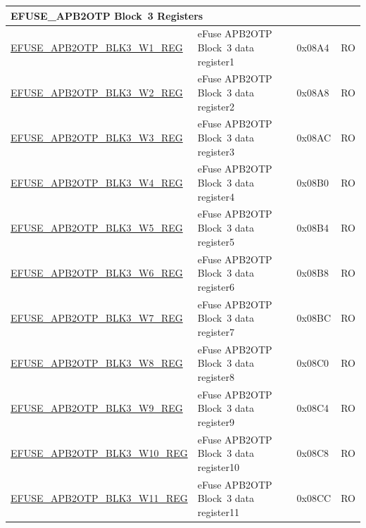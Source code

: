 \begin{longtable}{ | p{7cm} | p{6cm} | p{1.2cm} | p{1.5cm} | }
\multicolumn{4}{|l|}{\textbf{EFUSE\_APB2OTP Block~3 Registers}} \\ \hline
\hyperref[regdesc:EFUSEAPB2OTPBLK3WNREG]{EFUSE\_APB2OTP\_BLK3\_W1\_REG} & eFuse APB2OTP Block~3 data register1 & 0x08A4 & RO \\\hline
\hyperref[regdesc:EFUSEAPB2OTPBLK3WNREG]{EFUSE\_APB2OTP\_BLK3\_W2\_REG} & eFuse APB2OTP Block~3 data register2 & 0x08A8 & RO \\\hline
\hyperref[regdesc:EFUSEAPB2OTPBLK3WNREG]{EFUSE\_APB2OTP\_BLK3\_W3\_REG} & eFuse APB2OTP Block~3 data register3 & 0x08AC & RO \\\hline
\hyperref[regdesc:EFUSEAPB2OTPBLK3WNREG]{EFUSE\_APB2OTP\_BLK3\_W4\_REG} & eFuse APB2OTP Block~3 data register4 & 0x08B0 & RO \\\hline
\hyperref[regdesc:EFUSEAPB2OTPBLK3WNREG]{EFUSE\_APB2OTP\_BLK3\_W5\_REG} & eFuse APB2OTP Block~3 data register5 & 0x08B4 & RO \\\hline
\hyperref[regdesc:EFUSEAPB2OTPBLK3WNREG]{EFUSE\_APB2OTP\_BLK3\_W6\_REG} & eFuse APB2OTP Block~3 data register6 & 0x08B8 & RO \\\hline
\hyperref[regdesc:EFUSEAPB2OTPBLK3WNREG]{EFUSE\_APB2OTP\_BLK3\_W7\_REG} & eFuse APB2OTP Block~3 data register7 & 0x08BC & RO \\\hline
\hyperref[regdesc:EFUSEAPB2OTPBLK3WNREG]{EFUSE\_APB2OTP\_BLK3\_W8\_REG} & eFuse APB2OTP Block~3 data register8 & 0x08C0 & RO \\\hline
\hyperref[regdesc:EFUSEAPB2OTPBLK3WNREG]{EFUSE\_APB2OTP\_BLK3\_W9\_REG} & eFuse APB2OTP Block~3 data register9 & 0x08C4 & RO \\\hline
\hyperref[regdesc:EFUSEAPB2OTPBLK3WNREG]{EFUSE\_APB2OTP\_BLK3\_W10\_REG} & eFuse APB2OTP Block~3 data register10 & 0x08C8 & RO \\\hline
\hyperref[regdesc:EFUSEAPB2OTPBLK3WNREG]{EFUSE\_APB2OTP\_BLK3\_W11\_REG} & eFuse APB2OTP Block~3 data register11 & 0x08CC & RO \\\hline


\end{longtable}
